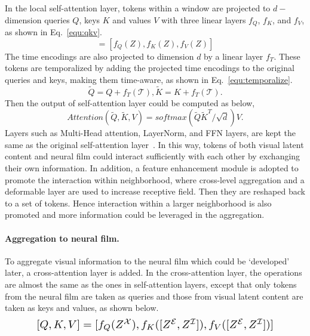 \documentclass[10pt,twocolumn,letterpaper]{article}
\begin{document}
In the local self-attention layer, tokens within a window are projected to $d-$dimension queries $Q$, keys $K$ and values $V$ with three linear layers $f_Q$, $f_K$, and $f_V$, as shown in Eq.~\ref{equ:qkv}.
\begin{equation}
    [Q, K, V] = [f_Q(Z), f_K(Z), f_V(Z)]
    \label{equ:qkv}
\end{equation}
The time encodings are also projected to dimension $d$ by a linear layer $f_T$.
These tokens are temporalized by adding the projected time encodings to the original queries and keys, making them time-aware, as shown in Eq.~\ref{equ:temporalize}.
\begin{equation}
    \widetilde{Q}=Q + f_T(\mathcal{T}), \widetilde{K}=K + f_T(\mathcal{T}).
    \label{equ:temporalize}
\end{equation}
Then the output of self-attention layer could be computed as below,
\begin{equation}
    Attention(\widetilde{Q}, \widetilde{K}, V) = softmax(\widetilde{Q}\widetilde{K}^T/\sqrt{d})V.
\end{equation}
Layers such as Multi-Head attention, LayerNorm, and FFN layers, are kept the same as the original self-attention layer~\cite{Transformer}.
In this way, tokens of both visual latent content and neural film could interact sufficiently with each other by exchanging their own information.
In addition, a feature enhancement module is adopted to promote the interaction within neighborhood, where cross-level aggregation and a deformable layer\cite{DCN} are used to increase receptive field. Then they are reshaped back to a set of tokens. Hence interaction within a larger neighborhood is also promoted and more information could be leveraged in the aggregation.

\paragraph{Aggregation to neural film.} 
To aggregate visual information to the neural film which could be `developed' later, a cross-attention layer is added.
In the cross-attention layer, the operations are almost the same as the ones in self-attention layers, except that only tokens from the neural film are taken as queries and those from visual latent content are taken as keys and values, as shown below.
\begin{equation}
\resizebox{0.85\columnwidth}{!}{
$[Q, K, V] = [f_Q(Z^{\mathcal{X}}), f_K([Z^{\mathcal{E}}, Z^{\mathcal{I}}]), f_V([Z^{\mathcal{E}}, Z^{\mathcal{I}}])]$
}
\end{equation}
\end{document}
